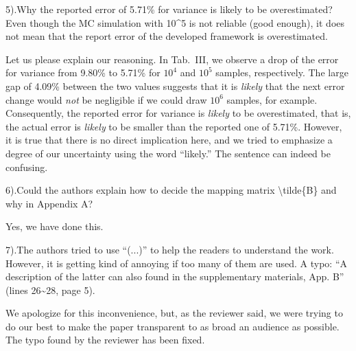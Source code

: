 \begin{reviewer}
5).Why the reported error of 5.71\% for variance is likely to be overestimated? Even though the MC simulation with 10\^{}5 is not reliable (good enough), it does not mean that the report error of the developed framework is overestimated.
\end{reviewer}
\begin{authors}
Let us please explain our reasoning.
In Tab.~III, we observe a drop of the error for variance from 9.80\% to 5.71\% for $10^4$ and $10^5$ samples, respectively.
The large gap of 4.09\% between the two values suggests that it is \emph{likely} that the next error change would \emph{not} be negligible if we could draw $10^6$ samples, for example.
Consequently, the reported error for variance is \emph{likely} to be overestimated, that is, the actual error is \emph{likely} to be smaller than the reported one of 5.71\%.
However, it is true that there is no direct implication here, and we tried to emphasize a degree of our uncertainty using the word ``likely.''
The sentence can indeed be confusing.

\end{authors}

\begin{reviewer}
6).Could the authors explain how to decide the mapping matrix \textbackslash{}tilde\{B\} and why in Appendix A?
\end{reviewer}
\begin{authors}
Yes, we have done this.
\end{authors}

\begin{reviewer}
7).The authors tried to use  ``(...)'' to help the readers to understand the work. However, it is getting kind of annoying if too many of them are used. A typo: ``A description of the latter can also found in the supplementary materials, App. B'' (lines 26\~{}28, page 5).
\end{reviewer}
\begin{authors}
We apologize for this inconvenience, but, as the reviewer said, we were trying to do our best to make the paper transparent to as broad an audience as possible.
The typo found by the reviewer has been fixed.
\end{authors}
